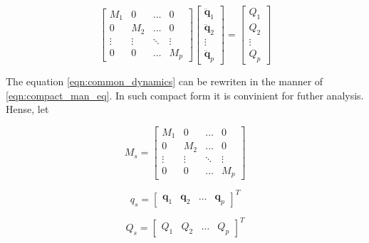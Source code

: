 \begin{equation}
    \label{eqn:common_dynamics}
    \begin{bmatrix}
        M_1 & 0   & \dots & 0 \\
        0   & M_2 & \dots & 0 \\
        \vdots & \vdots & \ddots & \vdots \\
        0   & 0   & \dots & M_p
    \end{bmatrix}
    \begin{bmatrix}
        \ddot{\mathbf{q}}_1 \\ \ddot{\mathbf{q}}_2 \\ \vdots \\ \ddot{\mathbf{q}}_p
    \end{bmatrix}
    = 
    \begin{bmatrix}
        Q_1 \\ Q_2 \\ \vdots \\ Q_p
    \end{bmatrix}
\end{equation}

The equation \ref{eqn:common_dynamics} can be rewriten in the manner of
\ref{eqn:compact_man_eq}. In such compact form it is convinient for futher analysis. 
Hense, let

\begin{equation}
    \label{eqn:common_mass}
    M_s = 
    \begin{bmatrix}
        M_1 & 0   & \dots & 0 \\
        0   & M_2 & \dots & 0 \\
        \vdots & \vdots & \ddots & \vdots \\
        0   & 0   & \dots & M_p
    \end{bmatrix}
\end{equation}

\begin{equation}
    \label{eqn:common_q}
    q_s = 
    \begin{bmatrix}
        \mathbf{q}_1 & \mathbf{q}_2 & \dots & \mathbf{q}_p
    \end{bmatrix}^T
\end{equation}

\begin{equation}
    \label{eqn:common_bias}
    Q_s = 
    \begin{bmatrix}
        Q_1 & Q_2 & \dots & Q_p
    \end{bmatrix}^T
\end{equation}

